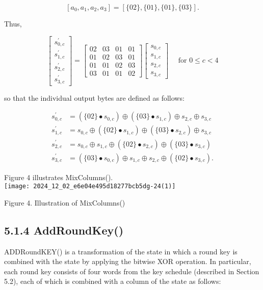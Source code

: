 \[
\left[a_{0}, a_{1}, a_{2}, a_{3}\right]=[\{02\},\{01\},\{01\},\{03\}] .
\]

Thus,

\[
\left[\begin{array}{l}
s_{0, c}^{\prime} \\
s_{1, c}^{\prime} \\
s_{2, c}^{\prime} \\
s_{3, c}^{\prime}
\end{array}\right]=\left[\begin{array}{llll}
02 & 03 & 01 & 01 \\
01 & 02 & 03 & 01 \\
01 & 01 & 02 & 03 \\
03 & 01 & 01 & 02
\end{array}\right]\left[\begin{array}{l}
s_{0, c} \\
s_{1, c} \\
s_{2, c} \\
s_{3, c}
\end{array}\right] \quad \text { for } 0 \leq c<4
\]

so that the individual output bytes are defined as follows:

\[
\begin{aligned}
s_{0, c}^{\prime} & =\left(\{02\} \bullet s_{0, c}\right) \oplus\left(\{03\} \bullet s_{1, c}\right) \oplus s_{2, c} \oplus s_{3, c} \\
s_{1, c}^{\prime} & =s_{0, c} \oplus\left(\{02\} \bullet s_{1, c}\right) \oplus\left(\{03\} \bullet s_{2, c}\right) \oplus s_{3, c} \\
s_{2, c}^{\prime} & =s_{0, c} \oplus s_{1, c} \oplus\left(\{02\} \bullet s_{2, c}\right) \oplus\left(\{03\} \bullet s_{3, c}\right) \\
s_{3, c}^{\prime} & =\left(\{03\} \bullet s_{0, c}\right) \oplus s_{1, c} \oplus s_{2, c} \oplus\left(\{02\} \bullet s_{3, c}\right) .
\end{aligned}
\]

Figure 4 illustrates MixColumns().\\
\texttt{[image: 2024\_12\_02\_e6e04e495d18277bcb5dg-24(1)]}

Figure 4. Illustration of MixColumns()

\subsection*{5.1.4 AddRoundKey()}
ADDRoundKEY() is a transformation of the state in which a round key is combined with the state by applying the bitwise XOR operation. In particular, each round key consists of four words from the key schedule (described in Section 5.2), each of which is combined with a column of the state as follows:

